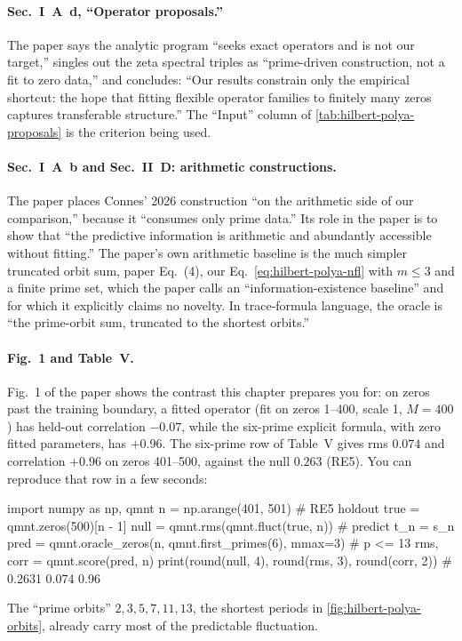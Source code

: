 \paragraph{Sec.~I~A~d, ``Operator proposals.''} The paper says the analytic program ``seeks exact operators and is not our target,'' singles out the zeta spectral triples \cite{zetatriples} as ``prime-driven construction, not a fit to zero data,'' and concludes: ``Our results constrain only the empirical shortcut: the hope that fitting flexible operator families to finitely many zeros captures transferable structure.'' The ``Input'' column of \cref{tab:hilbert-polya-proposals} is the criterion being used.

\paragraph{Sec.~I~A~b and Sec.~II~D: arithmetic constructions.} The paper places Connes' 2026 construction \cite{connes26} ``on the arithmetic side of our comparison,'' because it ``consumes only prime data.'' Its role in the paper is to show that ``the predictive information is arithmetic and abundantly accessible without fitting.'' The paper's own arithmetic baseline is the much simpler truncated orbit sum, paper Eq.~(4), our Eq.~\eqref{eq:hilbert-polya-nfl} with $m\le3$ and a finite prime set, which the paper calls an ``information-existence baseline'' and for which it explicitly claims no novelty. In trace-formula language, the oracle is ``the prime-orbit sum, truncated to the shortest orbits.''

\paragraph{Fig.~1 and Table~V.} Fig.~1 of the paper shows the contrast this chapter prepares you for: on zeros past the training boundary, a fitted operator (fit on zeros 1--400, scale 1, $M=400$) has held-out correlation $-0.07$, while the six-prime explicit formula, with zero fitted parameters, has $+0.96$. The six-prime row of Table~V gives rms $0.074$ and correlation $+0.96$ on zeros 401--500, against the null $0.263$ (RE5). You can reproduce that row in a few seconds:
\begin{pycode}
import numpy as np, qmnt
n    = np.arange(401, 501)                         # RE5 holdout
true = qmnt.zeros(500)[n - 1]
null = qmnt.rms(qmnt.fluct(true, n))               # predict t_n = s_n
pred = qmnt.oracle_zeros(n, qmnt.first_primes(6), mmax=3)  # p <= 13
rms, corr = qmnt.score(pred, n)
print(round(null, 4), round(rms, 3), round(corr, 2))   # 0.2631 0.074 0.96
\end{pycode}
The ``prime orbits'' $2,3,5,7,11,13$, the shortest periods in \cref{fig:hilbert-polya-orbits}, already carry most of the predictable fluctuation.

